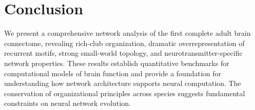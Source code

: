 \documentclass[11pt]{article}
\begin{document}
\section{Conclusion}

We present a comprehensive network analysis of the first complete adult brain connectome, revealing rich-club organization, dramatic overrepresentation of recurrent motifs, strong small-world topology, and neurotransmitter-specific network properties. These results establish quantitative benchmarks for computational models of brain function and provide a foundation for understanding how network architecture supports neural computation. The conservation of organizational principles across species suggests fundamental constraints on neural network evolution.



\end{document}
